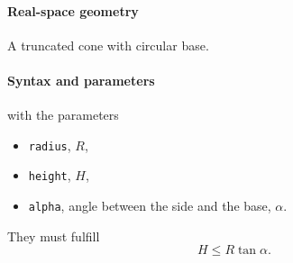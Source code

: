 \paragraph{Real-space geometry}
A truncated cone with circular base.

\begin{figure}[h]
\hfill
{}
\hfill
{}
\hfill
{}
\hfill
\end{figure}

\paragraph{Syntax and parameters}
\begin{quote}
\end{quote}
with the parameters
\begin{itemize}
\item \texttt{radius}, $R$,
\item \texttt{height}, $H$,
\item \texttt{alpha}, angle between the side and the base, $\alpha$.
\end{itemize}
They must fulfill
\begin{displaymath}
  H\le R\tan\alpha.
\end{displaymath}


